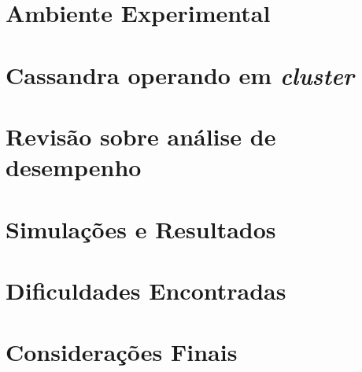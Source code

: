 \documentclass[	12pt, openright, twoside, a4paper, english, brazil]{abntex2}
\begin{document}
\chapter{Ambiente Experimental}
\label{cap:ambExperimental}



\chapter{Cassandra operando em \textit{cluster}}
\label{cap:cassandra}


\chapter{Revisão sobre análise de desempenho}
\label{cap:analisePerformance}


\chapter{Simulações e Resultados}
\label{cap:resultados}



\chapter{Dificuldades Encontradas}
\label{cap:dificuldadesEncontradas}



% 

\chapter{Considerações Finais}
\label{cap:conclusoes}




\postextual




%
%

\clearpage



%
\end{document}
